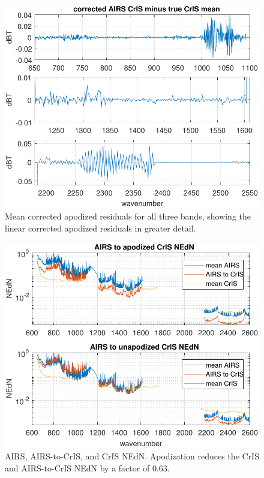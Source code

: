 \documentclass[journal]{IEEEtran}
\begin{document}
\begin{figure} %
  \centering
  \includegraphics[width=\linewidth]{figures/ap_decon_corr.pdf}
  \caption{Mean corrected apodized residuals for all three bands,
    showing the linear corrected apodized residuals in greater
    detail.}
  \label{statAll1}
\end{figure}


\begin{figure} %
  \centering
  \includegraphics[width=\linewidth]{figures/a2cris_nedn.pdf}
  \caption{AIRS, AIRS-to-CrIS, and CrIS NEdN.
    Apodization reduces the CrIS and AIRS-to-CrIS NEdN by a
    factor of $0.63$.}
  \label{nedn}
\end{figure}
\end{document}
